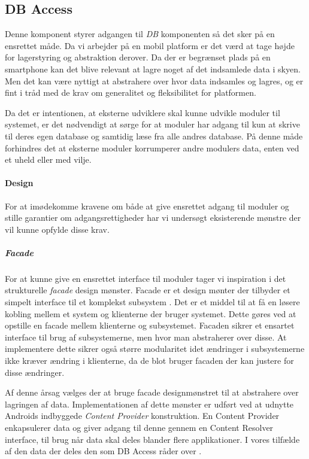 \subsection*{DB Access}
Denne komponent styrer adgangen til \textit{DB} komponenten så det sker på en ensrettet måde.
Da vi arbejder på en mobil platform er det værd at tage højde for lagerstyring og abstraktion derover.
Da der er begrænset plads på en smartphone kan det blive relevant at lagre noget af det indsamlede data i skyen.
Men det kan være nyttigt at abstrahere over hvor data indsamles og lagres, og er fint i tråd med de krav om generalitet og fleksibilitet for platformen.

Da det er intentionen, at eksterne udviklere skal kunne udvikle moduler til systemet, er det nødvendigt at sørge for at moduler har adgang til kun at skrive til deres egen database og samtidig læse fra alle andres database.
På denne måde forhindres det at eksterne moduler korrumperer andre modulers data, enten ved et uheld eller med vilje.

\paragraph{Design} 
For at imødekomme kravene om både at give ensrettet adgang til moduler og stille garantier om adgangsrettigheder har vi undersøgt eksisterende mønstre der vil kunne opfylde disse krav.

\subparagraph{Facade}
For at kunne give en ensrettet interface til moduler tager vi inspiration i det strukturelle \textit{facade} design mønster.
Facade er et design mønter der tilbyder et simpelt interface til et komplekst subsystem \citep{DATGANGOFFOUR}. 
Det er et middel til at få en løsere kobling mellem et system og klienterne der bruger systemet.
Dette gøres ved at opstille en facade mellem klienterne og subsystemet.
Facaden sikrer et ensartet interface til brug af subsystemerne, men hvor man abstraherer over disse.
At implementere dette sikrer også større modularitet idet ændringer i subsystemerne ikke kræver ændring i klienterne, da de blot bruger facaden der kan justere for disse ændringer.

Af denne årsag vælges der at bruge facade designmønstret til at abstrahere over lagringen af data.
Implementationen af dette mønster er udført ved at udnytte Androids indbyggede \textit{Content Provider} konstruktion.
En Content Provider enkapsulerer data og giver adgang til denne gennem en Content Resolver interface, til brug når data skal deles blander flere applikationer. I vores tilfælde af den data der deles den som DB Access råder over \citep{contentprovider}.

